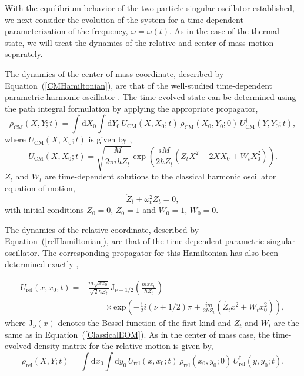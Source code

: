 \documentclass[preprints,article,accept,moreauthors,pdftex]{Definitions/mdpi}
\begin{document}
With the equilibrium behavior of the two-particle singular oscillator established, we next consider the evolution of the system for a time-dependent parameterization of the frequency, $\omega = \omega(t)$. As in the case of the thermal state, we will treat the dynamics of the relative and center of mass motion separately.     

The dynamics of the center of mass coordinate, described by Equation~(\ref{CMHamiltonian}), are that of the well-studied time-dependent parametric harmonic oscillator \cite{Husimi1953}. The time-evolved state can be determined using the path integral formulation by applying the appropriate propagator,
\begin{equation}
	\label{EvolvedCM}
	\rho_{\mathrm{CM}}(X,Y;t) = \int \mathrm{d}X_0 \int \mathrm{d}Y_0 \, U_{\mathrm{CM}}(X,X_0;t) \, \rho_{\mathrm{CM}}(X_0,Y_0;0) \, U_{\mathrm{CM}}^{\dagger}(Y,Y_0;t), 
\end{equation}
where $U_{\mathrm{CM}}(X,X_0;t)$ is given by \cite{Husimi1953},
\begin{equation}
	U_{\mathrm{CM}}(X,X_0;t) = \sqrt{\frac{M}{2 \pi i h Z_t}}\exp\left(\frac{iM}{2\hbar Z_t} (\dot{Z_t}X^2-2XX_0+W_tX_0^2)\right).
\end{equation} 
$Z_t$ and $W_t$ are time-dependent solutions to the classical harmonic oscillator equation of motion,
\begin{equation}
	\label{ClassicalEOM}
	\ddot{Z}_t + \omega_t^2 Z_t = 0,
\end{equation}
with initial conditions $Z_0 = 0$, $\dot{Z}_0 = 1$ and $W_0 = 1$, $\dot{W}_0 = 0$.

The dynamics of the relative coordinate, described by Equation~(\ref{relHamiltonian}), are that of the time-dependent parametric singular oscillator. The corresponding propagator for this Hamiltonian has also been determined exactly \cite{Dodonov1972, Dodonov1975, Khandekar1986, Dodonov1992},   

\begin{equation}
	\begin{split}
	U_{\mathrm{rel}}(x,x_0,t) = &\frac{m \sqrt{x x_0}}{\sqrt{2}\hbar Z_t} \, \mathrm{J}_{\nu-1/2}\left(\frac{m x x_0}{\hbar Z_t}\right) \\ & \qquad \times \mathrm{exp}\left(-\frac{1}{2}i(\nu+1/2)\pi+\frac{i m}{2 \hbar Z_t}(\dot{Z_t}x^2+W_t x_0^2)\right),
	\end{split}
\end{equation}
where $\mathrm{J}_{\nu}(x)$ denotes the Bessel function of the first kind \cite{AbramowitzBook} and $Z_t$ and $W_t$ are the same as in Equation~(\ref{ClassicalEOM}). As in the center of mass case, the time-evolved density matrix for the relative motion is given by,
\begin{equation}
	\label{Evolvedrel}
	\rho_{\mathrm{rel}}(X,Y;t) = \int \mathrm{d}x_0 \int \mathrm{d}y_0 \, U_{\mathrm{rel}}(x,x_0;t) \, \rho_{\mathrm{rel}}(x_0,y_0;0) \, U_{\mathrm{rel}}^{\dagger}(y,y_0;t).
\end{equation}
\end{document}
